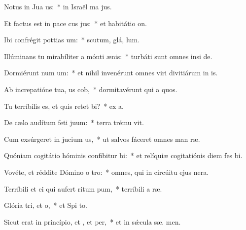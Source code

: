 \item Notus in Jua us:~* in Israël ma  jus.
\item Et factus est in pace cus jus:~* et habitátio   on.
\item Ibi confrégit pottias um:~* scutum, glá,  lum.
\item Illúminans tu mirabíliter a mónti ænis:~* turbáti sunt omnes insi de.
\item Dormiérunt num um:~* et nihil invenérunt omnes viri divitiárum in  is.
\item Ab increpatióne tua, us cob,~* dormitavérunt qui a quos.
\item Tu terríbilis es, et quis retet bi?~* ex   a.
\item De cælo audítum feti juum:~* terra trému  vit.
\item Cum exsúrgeret in jucium us,~* ut salvos fáceret omnes man ræ.
\item Quóniam cogitátio hóminis confibitur bi:~* et relíquiæ cogitatiónis diem fes  bi.
\item Vovéte, et réddite Dómino o tro:~* omnes, qui in circúitu ejus  nera.
\item Terríbili et ei qui aufert ritum pum,~* terríbili a  ræ.
\item Glória tri, et o,~* et Spi to.
\item Sicut erat in princípio, et , et per,~* et in sǽcula sæ. men.
